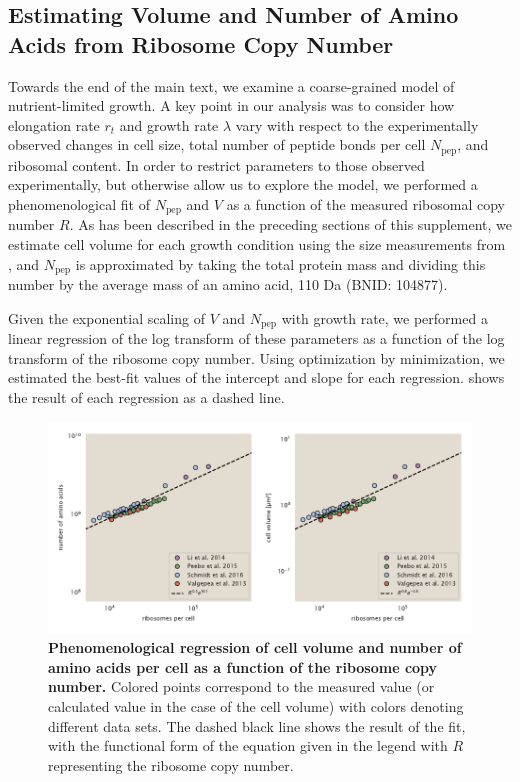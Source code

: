 \subsection{Estimating Volume and Number of Amino Acids from Ribosome Copy Number}
Towards the end of the main text, we examine a coarse-grained model of
nutrient-limited growth. A key point in our analysis was to consider  how
elongation rate $r_t$ and growth rate $\lambda$ vary with respect to the
experimentally observed changes in cell size, total number of peptide bonds per
cell  $N_\text{pep}$, and ribosomal content.  In order to restrict parameters
to those observed experimentally, but otherwise allow us to explore the
model, we performed a phenomenological fit of $N_\text{pep}$ and $V$ as a
function of the measured ribosomal copy number $R$. As has been described in the
preceding sections of this supplement, we estimate cell volume for each growth
condition using the size measurements from \cite{si2017,si2019}, and
$N_\text{pep}$ is approximated by taking the total protein mass and dividing
this number by the average mass of an amino acid, 110 Da (BNID: 104877).

Given the  exponential scaling of $V$ and $N_\text{pep}$ with growth rate, we
performed a linear regression of the log transform of these parameters as a
function of the log transform of the ribosome copy number. Using optimization by
minimization, we estimated the best-fit values of the intercept and slope for
each regression.  shows the result of each regression as a dashed
line.

\begin{figure}
  \centering
    \includegraphics{SI_figs/log_log_regression_naa_vol.pdf}
    \caption{{\textbf{Phenomenological regression of cell volume and number of
    amino acids per cell as a function of the ribosome copy number.} Colored
    points correspond to the measured value (or calculated value in the case of
    the cell volume) with colors denoting different data sets. The dashed black
    line shows the result of the fit, with the functional form of the equation
    given in the legend with $R$ representing the ribosome copy number.}
  }
  \label{fig:naa_v_fit}
\end{figure}
